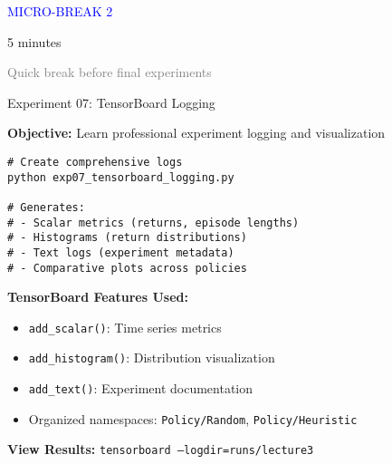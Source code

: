 \documentclass[aspectratio=169,10pt]{beamer}
\begin{document}
\begin{frame}[plain]
\begin{center}
\Huge \textcolor{blue}{MICRO-BREAK 2}

\vfill

\Large 5 minutes

\vfill

\textcolor{gray}{Quick break before final experiments}
\end{center}
\end{frame}

\begin{frame}[fragile]{Experiment 07: TensorBoard Logging}

\textbf{Objective:} Learn professional experiment logging and visualization

\begin{lstlisting}
# Create comprehensive logs
python exp07_tensorboard_logging.py

# Generates:
# - Scalar metrics (returns, episode lengths)
# - Histograms (return distributions) 
# - Text logs (experiment metadata)
# - Comparative plots across policies
\end{lstlisting}

\vfill

\textbf{TensorBoard Features Used:}
\begin{itemize}
    \item \texttt{add\_scalar()}: Time series metrics
    \item \texttt{add\_histogram()}: Distribution visualization
    \item \texttt{add\_text()}: Experiment documentation
    \item Organized namespaces: \texttt{Policy/Random}, \texttt{Policy/Heuristic}
\end{itemize}

\vfill

\textbf{View Results:} \texttt{tensorboard --logdir=runs/lecture3}

\end{frame}
\end{document}
